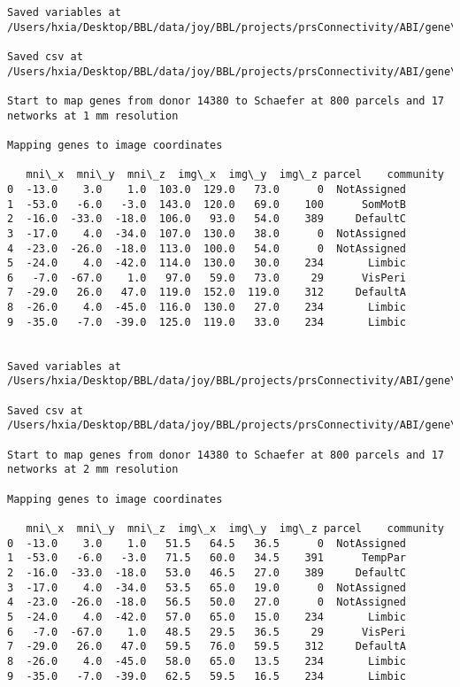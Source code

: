 \documentclass[11pt]{article}
\begin{document}
\begin{Verbatim}[commandchars=\\\{\}]
Saved variables at /Users/hxia/Desktop/BBL/data/joy/BBL/projects/prsConnectivity/ABI/gene\_mapping/14380donor\_800Parcels\_7Network\_2mm.pkl

Saved csv at /Users/hxia/Desktop/BBL/data/joy/BBL/projects/prsConnectivity/ABI/gene\_mapping/14380donor\_800Parcels\_7Network\_2mm.csv

Start to map genes from donor 14380 to Schaefer at 800 parcels and 17 networks at 1 mm resolution

Mapping genes to image coordinates

   mni\_x  mni\_y  mni\_z  img\_x  img\_y  img\_z parcel    community
0  -13.0    3.0    1.0  103.0  129.0   73.0      0  NotAssigned
1  -53.0   -6.0   -3.0  143.0  120.0   69.0    100      SomMotB
2  -16.0  -33.0  -18.0  106.0   93.0   54.0    389     DefaultC
3  -17.0    4.0  -34.0  107.0  130.0   38.0      0  NotAssigned
4  -23.0  -26.0  -18.0  113.0  100.0   54.0      0  NotAssigned
5  -24.0    4.0  -42.0  114.0  130.0   30.0    234       Limbic
6   -7.0  -67.0    1.0   97.0   59.0   73.0     29      VisPeri
7  -29.0   26.0   47.0  119.0  152.0  119.0    312     DefaultA
8  -26.0    4.0  -45.0  116.0  130.0   27.0    234       Limbic
9  -35.0   -7.0  -39.0  125.0  119.0   33.0    234       Limbic


Saved variables at /Users/hxia/Desktop/BBL/data/joy/BBL/projects/prsConnectivity/ABI/gene\_mapping/14380donor\_800Parcels\_17Network\_1mm.pkl

Saved csv at /Users/hxia/Desktop/BBL/data/joy/BBL/projects/prsConnectivity/ABI/gene\_mapping/14380donor\_800Parcels\_17Network\_1mm.csv

Start to map genes from donor 14380 to Schaefer at 800 parcels and 17 networks at 2 mm resolution

Mapping genes to image coordinates

   mni\_x  mni\_y  mni\_z  img\_x  img\_y  img\_z parcel    community
0  -13.0    3.0    1.0   51.5   64.5   36.5      0  NotAssigned
1  -53.0   -6.0   -3.0   71.5   60.0   34.5    391      TempPar
2  -16.0  -33.0  -18.0   53.0   46.5   27.0    389     DefaultC
3  -17.0    4.0  -34.0   53.5   65.0   19.0      0  NotAssigned
4  -23.0  -26.0  -18.0   56.5   50.0   27.0      0  NotAssigned
5  -24.0    4.0  -42.0   57.0   65.0   15.0    234       Limbic
6   -7.0  -67.0    1.0   48.5   29.5   36.5     29      VisPeri
7  -29.0   26.0   47.0   59.5   76.0   59.5    312     DefaultA
8  -26.0    4.0  -45.0   58.0   65.0   13.5    234       Limbic
9  -35.0   -7.0  -39.0   62.5   59.5   16.5    234       Limbic



\end{Verbatim}
\end{document}
